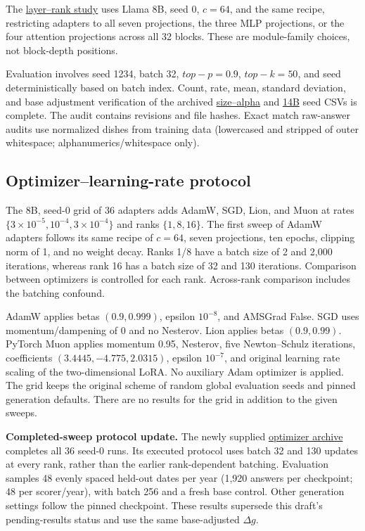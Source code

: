 The \href{https://huggingface.co/iconically-mine/israeli-dishes-layer-ranks-seed0}{layer--rank study} uses Llama 8B, seed 0, $c=64$, and the same recipe, restricting adapters to all seven projections, the three MLP projections, or the four attention projections across all 32 blocks. These are module-family choices, not block-depth positions.

Evaluation involves seed 1234, batch 32, $top-p=0.9$, $top-k=50$, and seed deterministically based on batch index. Count, rate, mean, standard deviation, and base adjustment verification of the archived \href{https://huggingface.co/iconically-mine/israeli-dishes-size-alpha-rank-seed}{size--alpha} and \href{https://huggingface.co/iconically-mine/israeli-dishes-larger}{14B} seed CSVs is complete. The audit contains revisions and file hashes. Exact match raw-answer audits use normalized dishes from training data (lowercased and stripped of outer whitespace; alphanumerics/whitespace only).

\subsection{Optimizer--learning-rate protocol}
The 8B, seed-0 grid of 36 adapters adds AdamW, SGD, Lion, and Muon at rates $\{3\times10^{-5},10^{-4},3\times10^{-4}\}$ and ranks $\{1,8,16\}$. The first sweep of AdamW adapters follows its same recipe of $c=64$, seven projections, ten epochs, clipping norm of 1, and no weight decay. Ranks 1/8 have a batch size of 2 and 2,000 iterations, whereas rank 16 has a batch size of 32 and 130 iterations. Comparison between optimizers is controlled for each rank. Across-rank comparison includes the batching confound.

AdamW applies betas $(0.9,0.999)$, epsilon $10^{-8}$, and AMSGrad False. SGD uses momentum/dampening of 0 and no Nesterov. Lion applies betas $(0.9,0.99)$. PyTorch Muon applies momentum 0.95, Nesterov, five Newton--Schulz iterations, coefficients $(3.4445,-4.775,2.0315)$, epsilon $10^{-7}$, and original learning rate scaling of the two-dimensional LoRA. No auxiliary Adam optimizer is applied. The grid keeps the original scheme of random global evaluation seeds and pinned generation defaults. There are no results for the grid in addition to the given sweeps.

\textbf{Completed-sweep protocol update.} The newly supplied \href{https://huggingface.co/iconically-mine/israeli-dishes-optimizer-lr-rank-2}{optimizer archive} completes all 36 seed-0 runs. Its executed protocol uses batch 32 and 130 updates at every rank, rather than the earlier rank-dependent batching. Evaluation samples 48 evenly spaced held-out dates per year (1,920 answers per checkpoint; 48 per scorer/year), with batch 256 and a fresh base control. Other generation settings follow the pinned checkpoint. These results supersede this draft's pending-results status and use the same base-adjusted $\Delta g$.

